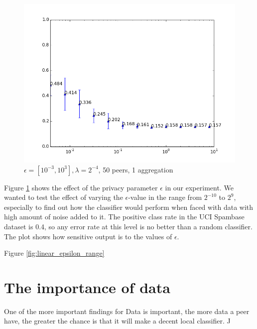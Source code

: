\begin{figure}[H]
	\centering
	\includegraphics[width=\textwidth]{fig/spambase/eps2e-8-2e8,budg=eps,peers10,groups10,reg2e-2-data368-pubAll-spam-baseline-testset}
 	\caption{$\epsilon = [10^{-3}, 10^{3}], \lambda = 2^{-4}$, 50 peers, 1 aggregation}
 	\label{fig:epsilon_big_range}
\end{figure}
 
Figure \ref{fig:epsilon_big_range} shows the effect of the privacy parameter $\epsilon$ in our experiment. We wanted to test the effect of varying the $\epsilon$-value in the range from $2^{-10}$ to $2^9$, especially to find out how the classifier would perform when faced with data with high amount of noise added to it. The positive class rate in the UCI Spambase dataset is 0.4, so any error rate at this level is no better than a random classifier. The plot shows how sensitive output is to the values of $\epsilon$.

Figure \ref{fig:linear_epsilon_range} 

\section{The importance of data}
One of the more important findings for 
Data is important, the more data a peer have, the greater the chance is that it will make a decent local classifier. J

